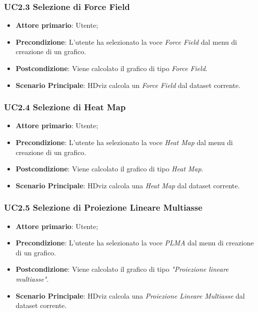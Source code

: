 \subsubsection{UC2.3 Selezione di Force Field}
\label{ssub:UC2.3}
\begin{itemize}

    \item \textbf{Attore primario}: Utente;

    \item \textbf{Precondizione}:   L'utente ha selezionato la voce \emph{Force Field} dal menu di creazione di un grafico.

    \item \textbf{Postcondizione}:  Viene calcolato il grafico di tipo \emph{Force Field}.
	
	\item \textbf{Scenario Principale}: HDviz calcola un \emph{Force Field} dal dataset corrente.

\end{itemize}


\subsubsection{UC2.4 Selezione di Heat Map}
\label{ssub:UC2.4}
\begin{itemize}

    \item \textbf{Attore primario}: Utente;

	\item \textbf{Precondizione}:   L'utente ha selezionato la voce \emph{Heat Map} dal menu di creazione di un grafico.

    \item \textbf{Postcondizione}:  Viene calcolato il grafico di tipo \emph{Heat Map}.

	\item \textbf{Scenario Principale}: HDviz calcola una \emph{Heat Map} dal dataset corrente.

\end{itemize}


\subsubsection{UC2.5 Selezione di Proiezione Lineare Multiasse}
\label{ssub:UC2.5}
\begin{itemize}

    \item \textbf{Attore primario}: Utente;

    \item \textbf{Precondizione}:   L'utente ha selezionato la voce \emph{PLMA} dal menu di creazione di un grafico.

    \item \textbf{Postcondizione}:  Viene calcolato il grafico di tipo \emph{"Proiezione lineare multiasse"}.

	\item \textbf{Scenario Principale}: HDviz calcola una \emph{Proiezione Lineare Multiasse} dal dataset corrente.
\end{itemize}

